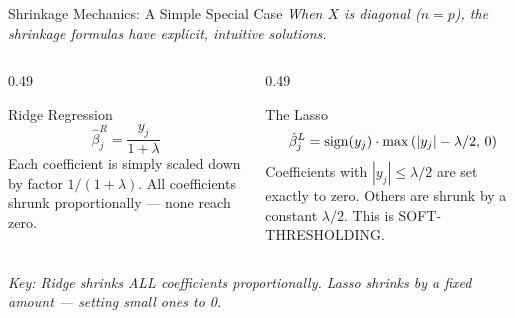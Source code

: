 \documentclass[ignorenonframetext,]{beamer}
\begin{document}
\begin{frame}{Shrinkage Mechanics: A Simple Special Case}
\emph{When $X$ is diagonal ($n = p$), the shrinkage formulas have explicit, intuitive solutions.}

\begin{columns}[T]
\begin{column}{0.49\textwidth}
\begin{block}{\small Ridge Regression}
\footnotesize
$$\hat{\beta}^R_j = \frac{y_j}{1 + \lambda}$$
Each coefficient is simply scaled down by factor $1/(1+\lambda)$. All coefficients shrunk proportionally --- none reach zero.
\end{block}
\end{column}
\begin{column}{0.49\textwidth}
\begin{exampleblock}{\small The Lasso}
\footnotesize
$$\hat{\beta}^L_j = \mathrm{sign}(y_j)\cdot\max\left(|y_j| - \lambda/2,\, 0\right)\hspace{-6pt}$$
Coefficients with $|y_j| \le \lambda/2$ are set exactly to zero. Others are shrunk by a constant $\lambda/2$. This is SOFT-THRESHOLDING.
\end{exampleblock}
\end{column}
\end{columns}

\vspace{6pt}
{\footnotesize\emph{Key: Ridge shrinks ALL coefficients proportionally. Lasso shrinks by a fixed amount --- setting small ones to 0.}}
\end{frame}
\end{document}
